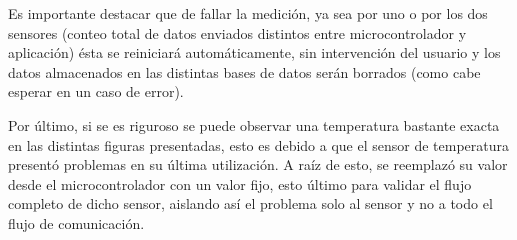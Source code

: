 Es importante destacar que de fallar la medición, ya sea por uno o por los dos sensores (conteo total de datos enviados distintos entre microcontrolador y aplicación) ésta se reiniciará automáticamente, sin intervención del usuario y los datos almacenados en las distintas bases de datos serán borrados (como cabe esperar en un caso de error).

Por último, si se es riguroso se puede observar una temperatura bastante exacta en las distintas figuras presentadas, esto es debido a que el sensor de temperatura presentó problemas en su última utilización. A raíz de esto, se reemplazó su valor desde el microcontrolador con un valor fijo, esto último para validar el flujo completo de dicho sensor, aislando así el problema solo al sensor y no a todo el flujo de comunicación.


